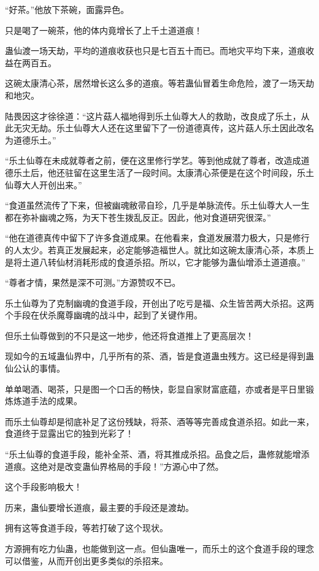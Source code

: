 \begin{this_body}
“好茶。”他放下茶碗，面露异色。

只是喝了一碗茶，他的体内竟增长了上千土道道痕！

蛊仙渡一场天劫，平均的道痕收获也只是七百五十而已。而地灾平均下来，道痕收益在两百五。

这碗太康清心茶，居然增长这么多的道痕。等若蛊仙冒着生命危险，渡了一场天劫和地灾。

陆畏因这才徐徐道：“这片菇人福地得到乐土仙尊大人的救助，改良成了乐土，从此无灾无劫。乐土仙尊大人还在这里留下了一份道德真传，这片菇人乐土因此改名为道德乐土。”

“乐土仙尊在未成就尊者之前，便在这里修行学艺。等到他成就了尊者，改造成道德乐土后，他还驻留在这里生活了一段时间。太康清心茶便是在这个时间段，乐土仙尊大人开创出来。”

“食道虽然流传了下来，但被幽魂敝帚自珍，几乎是单脉流传。乐土仙尊大人一生都在弥补幽魂之殇，为天下苍生拨乱反正。因此，他对食道研究很深。”

“他在道德真传中留下了许多食道成果。在他看来，食道发展潜力极大，只是修行的人太少。若真正发展起来，必定能够造福世人。就比如这碗太康清心茶，本质上是将土道八转仙材消耗形成的食道杀招。所以，它才能够为蛊仙增添土道道痕。”

“尊者才情，果然是深不可测。”方源赞叹不已。

乐土仙尊为了克制幽魂的食道手段，开创出了吃亏是福、众生皆苦两大杀招。这两个手段在伏杀魔尊幽魂的战斗中，起到了关键作用。

但乐土仙尊做到的不只是这一地步，他还将食道推上了更高层次！

现如今的五域蛊仙界中，几乎所有的茶、酒，皆是食道蛊虫残方。这已经是得到蛊仙公认的事情。

单单喝酒、喝茶，只是图一个口舌的畅快，彰显自家财富底蕴，亦或者是平日里锻炼炼道手法的成果。

而乐土仙尊却是彻底补足了这份残缺，将茶、酒等等完善成食道杀招。如此一来，食道终于显露出它的独到光彩了！

“乐土仙尊的食道手段，能补全茶、酒，将其推成杀招。品食之后，蛊修就能增添道痕。这绝对是改变蛊仙界格局的手段！”方源心中了然。

这个手段影响极大！

历来，蛊仙要增长道痕，最主要的手段还是渡劫。

拥有这等食道手段，等若打破了这个现状。

方源拥有吃力仙蛊，也能做到这一点。但仙蛊唯一，而乐土的这个食道手段的理念可以借鉴，从而开创出更多类似的杀招来。


\end{this_body}

